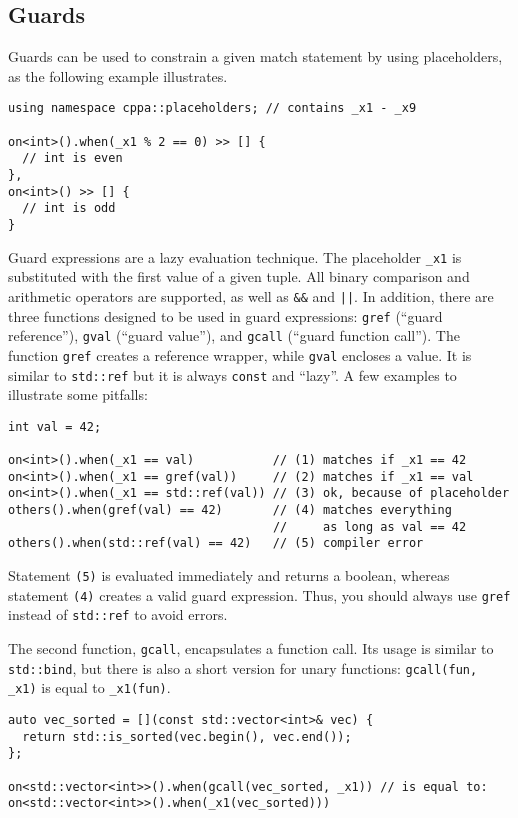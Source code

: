 \subsection{Guards}

Guards can be used to constrain a given match statement by using placeholders, as the following example illustrates.

\begin{lstlisting}
using namespace cppa::placeholders; // contains _x1 - _x9

on<int>().when(_x1 % 2 == 0) >> [] {
  // int is even
},
on<int>() >> [] {
  // int is odd
}
\end{lstlisting}

Guard expressions are a lazy evaluation technique.
The placeholder \lstinline^_x1^ is substituted with the first value of a given tuple.
All binary comparison and arithmetic operators are supported, as well as \lstinline^&&^ and \lstinline^||^.
In addition, there are three functions designed to be used in guard expressions: \lstinline^gref^ (``guard reference''), \lstinline^gval^ (``guard value''), and \lstinline^gcall^ (``guard function call'').
The function \lstinline^gref^ creates a reference wrapper, while \lstinline^gval^ encloses a value.
It is similar to \lstinline^std::ref^ but it is always \lstinline^const^ and ``lazy''.
A few examples to illustrate some pitfalls:

\begin{lstlisting}
int val = 42;

on<int>().when(_x1 == val)           // (1) matches if _x1 == 42
on<int>().when(_x1 == gref(val))     // (2) matches if _x1 == val
on<int>().when(_x1 == std::ref(val)) // (3) ok, because of placeholder
others().when(gref(val) == 42)       // (4) matches everything
                                     //     as long as val == 42
others().when(std::ref(val) == 42)   // (5) compiler error
\end{lstlisting}

Statement \texttt{(5)} is evaluated immediately and returns a boolean, whereas statement \texttt{(4)} creates a valid guard expression.
Thus, you should always use \lstinline^gref^ instead of \lstinline^std::ref^ to avoid errors.

The second function, \lstinline^gcall^, encapsulates a function call.
Its usage is similar to \lstinline^std::bind^, but there is also a short version for unary functions: \lstinline^gcall(fun, _x1)^ is equal to \lstinline^_x1(fun)^.

\begin{lstlisting}
auto vec_sorted = [](const std::vector<int>& vec) {
  return std::is_sorted(vec.begin(), vec.end());
};

on<std::vector<int>>().when(gcall(vec_sorted, _x1)) // is equal to:
on<std::vector<int>>().when(_x1(vec_sorted)))
\end{lstlisting}

